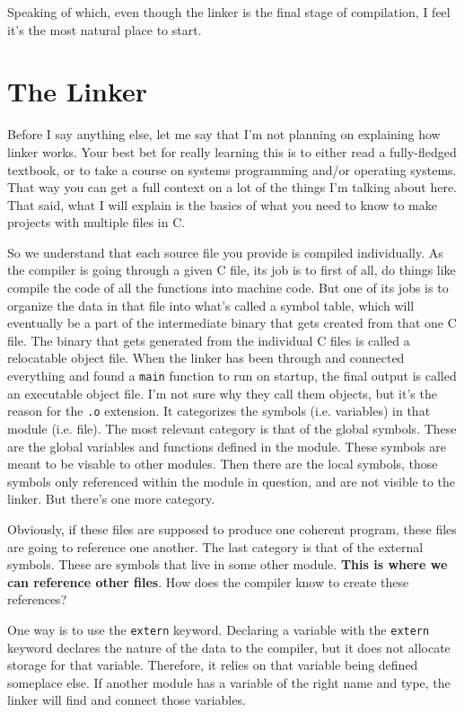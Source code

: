 \documentclass[ebook,11pt,oneside,openany]{memoir}
\newcommand{\cf}[1]{\texttt{#1}}
\begin{document}
Speaking of which, even though the linker is the final stage of compilation, I feel it's the most natural place to start.

\section{The Linker}
\label{sec:linker}

Before I say anything else, let me say that I'm not planning on explaining how linker works. Your best bet for really learning this is to either read a fully-fledged textbook, or to take a course on systems programming and/or operating systems. That way you can get a full context on a lot of the things I'm talking about here. That said, what I will explain is the basics of what you need to know to make projects with multiple files in C.

So we understand that each source file you provide is compiled individually. As the compiler is going through a given C file, its job is to first of all, do things like compile the code of all the functions into machine code. But one of its jobs is to organize the data in that file into what's called a symbol table, which will eventually be a part of the intermediate binary that gets created from that one C file. The binary that gets generated from the individual C files is called a relocatable object file. When the linker has been through and connected everything and found a \cf{main} function to run on startup, the final output is called an executable object file. I'm not sure why they call them objects, but it's the reason for the \cf{.o} extension. It categorizes the symbols (i.e. variables) in that module (i.e. file). The most relevant category is that of the global symbols. These are the global variables and functions defined in the module. These symbols are meant to be visable to other modules. Then there are the local symbols, those symbols only referenced within the module in question, and are not visible to the linker. But there's one more category.

Obviously, if these files are supposed to produce one coherent program, these files are going to reference one another. The last category is that of the external symbols. These are symbols that live in some other module. \textbf{This is where we can reference other files}. How does the compiler know to create these references? 

One way is to use the \cf{extern} keyword. Declaring a variable with the \cf{extern} keyword declares the nature of the data to the compiler, but it does not allocate storage for that variable. Therefore, it relies on that variable being defined someplace else. If another module has a variable of the right name and type, the linker will find and connect those variables.
\end{document}
